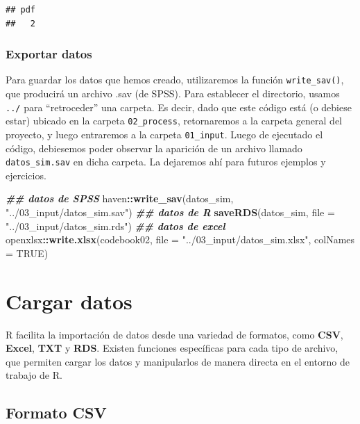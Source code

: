 \documentclass[
]{book}
\newenvironment{Shaded}{\begin{snugshade}}{\end{snugshade}}
\newcommand{\AttributeTok}[1]{\textcolor[rgb]{0.13,0.29,0.53}{#1}}
\newcommand{\ConstantTok}[1]{\textcolor[rgb]{0.56,0.35,0.01}{#1}}
\newcommand{\DocumentationTok}[1]{\textcolor[rgb]{0.56,0.35,0.01}{\textbf{\textit{#1}}}}
\newcommand{\FunctionTok}[1]{\textcolor[rgb]{0.13,0.29,0.53}{\textbf{#1}}}
\newcommand{\NormalTok}[1]{#1}
\newcommand{\SpecialCharTok}[1]{\textcolor[rgb]{0.81,0.36,0.00}{\textbf{#1}}}
\newcommand{\StringTok}[1]{\textcolor[rgb]{0.31,0.60,0.02}{#1}}
\begin{document}
\begin{verbatim}
## pdf 
##   2
\end{verbatim}

\subsection{Exportar datos}\label{exportar-datos}

Para guardar los datos que hemos creado, utilizaremos la función \texttt{write\_sav()}, que producirá un archivo .sav (de SPSS). Para establecer el directorio, usamos \texttt{../} para ``retroceder'' una carpeta. Es decir, dado que este código está (o debiese estar) ubicado en la carpeta \texttt{02\_process}, retornaremos a la carpeta general del proyecto, y luego entraremos a la carpeta \texttt{01\_input}. Luego de ejecutado el código, debiesemos poder observar la aparición de un archivo llamado \texttt{datos\_sim.sav} en dicha carpeta. La dejaremos ahí para futuros ejemplos y ejercicios.

\begin{Shaded}
\begin{Highlighting}[]
\DocumentationTok{\#\# datos de SPSS}
\NormalTok{haven}\SpecialCharTok{::}\FunctionTok{write\_sav}\NormalTok{(datos\_sim, }\StringTok{"../03\_input/datos\_sim.sav"}\NormalTok{)}
\DocumentationTok{\#\# datos de R}
\FunctionTok{saveRDS}\NormalTok{(datos\_sim, }\AttributeTok{file =} \StringTok{"../03\_input/datos\_sim.rds"}\NormalTok{)}
\DocumentationTok{\#\# datos de excel}
\NormalTok{openxlsx}\SpecialCharTok{::}\FunctionTok{write.xlsx}\NormalTok{(codebook02, }\AttributeTok{file =} \StringTok{"../03\_input/datos\_sim.xlsx"}\NormalTok{, }\AttributeTok{colNames =} \ConstantTok{TRUE}\NormalTok{)}
\end{Highlighting}
\end{Shaded}

\chapter{Cargar datos}\label{carga-datos}

R facilita la importación de datos desde una variedad de formatos, como \textbf{CSV}, \textbf{Excel}, \textbf{TXT} y \textbf{RDS}. Existen funciones específicas para cada tipo de archivo, que permiten cargar los datos y manipularlos de manera directa en el entorno de trabajo de R.

\section{Formato CSV}\label{formato-csv}
\end{document}
